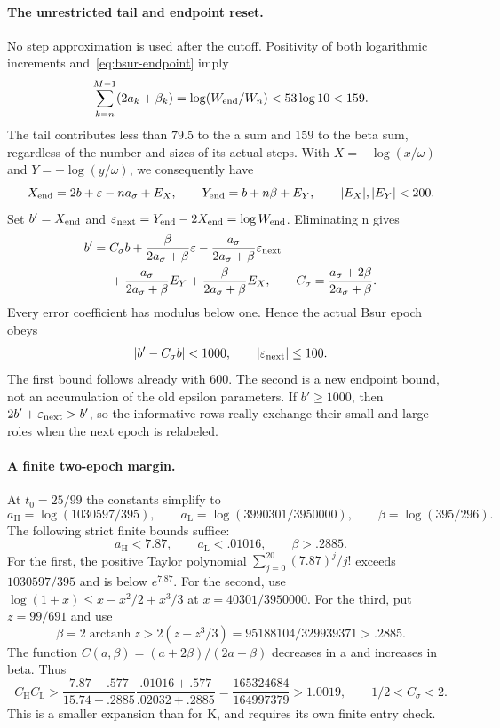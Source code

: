 \paragraph{The unrestricted tail and endpoint reset.}
No step approximation is used after the cutoff. Positivity of both logarithmic
increments and~\eqref{eq:bsur-endpoint} imply
\[
 \sum_{k=n}^{M-1}(2a_k+\beta_k)
 =\log(W_{\rm end}/W_n)<53\log10<159.
\]
The tail contributes less than $79.5$ to the a sum and $159$ to the beta sum,
regardless of the number and sizes of its actual steps. With
$X=-\log(x/\omega)$ and $Y=-\log(y/\omega)$, we consequently have
\[
 X_{\rm end}=2b+\varepsilon-na_\sigma+E_X,\qquad
 Y_{\rm end}=b+n\beta+E_Y,\qquad |E_X|,|E_Y|<200.
\]
Set $b'=X_{\rm end}$ and
$\varepsilon_{\rm next}=Y_{\rm end}-2X_{\rm end}=\log W_{\rm end}$.
Eliminating n gives
\begin{equation}\label{eq:bsur-exact-map}
 \begin{aligned}
 b'={}&C_\sigma b
 +\frac{\beta}{2a_\sigma+\beta}\varepsilon
 -\frac{a_\sigma}{2a_\sigma+\beta}\varepsilon_{\rm next}\\
 &+\frac{a_\sigma}{2a_\sigma+\beta}E_Y
 +\frac{\beta}{2a_\sigma+\beta}E_X,
 \qquad C_\sigma=\frac{a_\sigma+2\beta}{2a_\sigma+\beta}.
 \end{aligned}
\end{equation}
Every error coefficient has modulus below one. Hence the actual Bsur epoch obeys
\begin{equation}\label{eq:bsur-map-bounds}
 |b'-C_\sigma b|<1000,\qquad |\varepsilon_{\rm next}|\le100.
\end{equation}
The first bound follows already with 600. The second is a new endpoint bound,
not an accumulation of the old epsilon parameters. If $b'\ge1000$, then
$2b'+\varepsilon_{\rm next}>b'$, so the informative rows really exchange
their small and large roles when the next epoch is relabeled.

\paragraph{A finite two-epoch margin.}
At $t_0=25/99$ the constants simplify to
\[
 a_{\mathrm H}=\log(1030597/395),\qquad
 a_{\mathrm L}=\log(3990301/3950000),\qquad
 \beta=\log(395/296).
\]
The following strict finite bounds suffice:
\[
 a_{\mathrm H}<7.87,\qquad a_{\mathrm L}<.01016,\qquad \beta>.2885.
\]
For the first, the positive Taylor polynomial
$\sum_{j=0}^{20}(7.87)^j/j!$ exceeds $1030597/395$ and is below $e^{7.87}$.
For the second, use $\log(1+x)\le x-x^2/2+x^3/3$ at
$x=40301/3950000$. For the third, put $z=99/691$ and use
\[
 \beta=2\operatorname{arctanh}z
 >2(z+z^3/3)=95188104/329939371>.2885.
\]
The function $C(a,\beta)=(a+2\beta)/(2a+\beta)$ decreases in a and increases
in beta. Thus
\begin{equation}\label{eq:bsur-map-expansion}
 C_{\mathrm H}C_{\mathrm L}>
 \frac{7.87+.577}{15.74+.2885}
 \frac{.01016+.577}{.02032+.2885}
 =\frac{165324684}{164997379}>1.0019,
 \qquad 1/2<C_\sigma<2.
\end{equation}
This is a smaller expansion than for K, and requires its own finite entry check.

